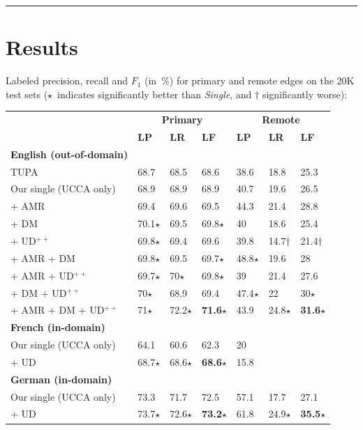\documentclass[a0,portrait]{a0poster}
\begin{document}
\begin{multicols}{2}
\hrule



\section*{Results}

Labeled precision, recall and $F_1$ (in~\%) for primary and remote edges
on the 20K test sets
($\star$~indicates significantly better than \textit{Single},
and $\dagger$ significantly worse):
\begin{center}
\setlength\tabcolsep{1cm}
\begin{tabular}{l|lll|lll}
& \multicolumn{3}{c|}{\bf Primary} & \multicolumn{3}{c}{\bf Remote} \\
& \textbf{LP} & \textbf{LR} & \textbf{LF}
& \textbf{LP} & \textbf{LR} & \textbf{LF} \\
\hline
\bf English (out-of-domain) & \\
TUPA \cite{hershcovich2017a}
& 68.7 & 68.5 & 68.6 & 38.6 & 18.8 & 25.3 \\
Our single (UCCA only)
& 68.9 & 68.9 & 68.9 & 40.7 & 19.6 & 26.5 \\
\cline{1-1}
+ AMR
& 69.4 & 69.6 & 69.5 & 44.3 & 21.4 & 28.8 \\
+ DM
& 70.1$\star$ & 69.5 & 69.8$\star$ & 40 & 18.6 & 25.4 \\
+ UD$^{++}$
& 69.8$\star$ & 69.4 & 69.6 & 39.8 & 14.7$\dagger$ & 21.4$\dagger$ \\
+ AMR + DM
& 69.8$\star$ & 69.5 & 69.7$\star$ & 48.8$\star$ & 19.6 & 28 \\
+ AMR + UD$^{++}$
& 69.7$\star$ & 70$\star$ & 69.8$\star$ & 39 & 21.4 & 27.6 \\
+ DM + UD$^{++}$
& 70$\star$ & 68.9 & 69.4 & 47.4$\star$ & 22 & 30$\star$ \\
+ AMR + DM + UD$^{++}$
& 71$\star$ & 72.2$\star$ & \textbf{71.6}$\star$ & 43.9 & 24.8$\star$ & \textbf{31.6}$\star$ \\
\hline
\bf French (in-domain) & \\
Our single (UCCA only) & 64.1 & 60.6 & 62.3 & 20 & \enskip 5.7 & \enskip 8.8 \\
+ UD & 68.7$\star$ & 68.6$\star$ & \textbf{68.6}$\star$ & 15.8 & \enskip 5.7 & \enskip 8.3 \\
\hline
\bf German (in-domain) & \\
Our single (UCCA only) & 73.3 & 71.7 & 72.5 & 57.1 & 17.7 & 27.1 \\
+ UD & 73.7$\star$ & 72.6$\star$ & \textbf{73.2}$\star$ & 61.8 & 24.9$\star$ & \textbf{35.5}$\star$
\end{tabular}
\end{center}


\end{multicols}
\end{document}
